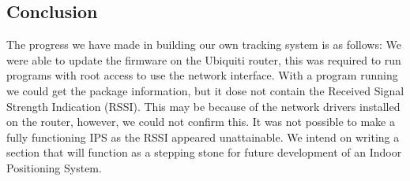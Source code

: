 \subsection*{Conclusion}
The progress we have made in building our own tracking system is as follows: We were able to update the firmware on the Ubiquiti router, this was required to run programs with root access to use the network interface. With a program running we could get the package information, but it dose not contain the Received Signal Strength Indication (RSSI). This may be because of the network drivers installed on the router, however, we could not confirm this. It was not possible to make a fully functioning IPS as the RSSI appeared unattainable. We intend on writing a section that will function as a stepping stone for future development of an Indoor Positioning System. 